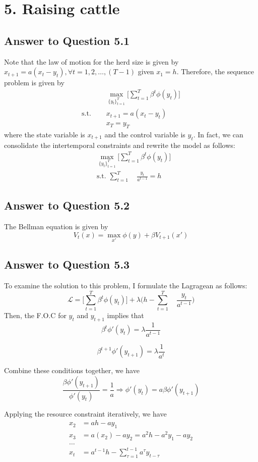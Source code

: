 \documentclass[11pt]{article}
\theoremstyle{definition}
\theoremstyle{boldtitle} %
\numberwithin{equation}{section}
\numberwithin{figure}{section}
\numberwithin{table}{section}
\begin{document}
\section*{5. Raising cattle}
\subsection*{Answer to Question 5.1}
Note that the law of motion for the herd size is given by $x_{t+1} = a (x_t - y_t), \forall t = 1,2, \ldots, (T-1)$ given $x_1 = h$.
Therefore, the sequence problem is given by 
\begin{align*}
& \max_{\{y_{t}\}_{t=1}^T} \bigg[\sum_{t=1}^T \beta^t \phi(y_t) \bigg] \\ 
\text{s.t.  } \quad & x_{t+1} = a(x_t - y_t) \\
& x_T = y_T
\end{align*}
where the state variable is $x_{t+1}$ and the control variable is $y_t$.
In fact, we can consolidate the intertemporal constraints and rewrite the model as follows:
\begin{align*}
& \max_{\{y_{t}\}_{t=1}^T} \bigg[\sum_{t=1}^T \beta^t \phi(y_t) \bigg] \\ 
& \text{s.t.  } \sum_{t=1}^T \quad \frac{y_t}{a^{t-1}} = h
\end{align*}


\subsection*{Answer to Question 5.2}
The Bellman equation is given by
\[
V_t(x) = \max_{x'} \phi(y) + \beta V_{t+1}(x')
\]


\subsection*{Answer to Question 5.3}
To examine the solution to this problem, I formulate the Lagragean as follows:
\[
\mathcal{L} = \bigg[\sum_{t=1}^T \beta^t \phi(y_t) \bigg] + \lambda \bigg(h - \sum_{t=1}^T \quad \frac{y_t}{a^{t-1}} \bigg)
\]
Then, the F.O.C for $y_t$ and $y_{t+1}$  implies that 
\[
\beta^t \phi'(y_t) = \lambda \frac{1}{a^{t-1}}
\]

\[
\beta^{t+1} \phi'(y_{t+1}) = \lambda \frac{1}{a^{t}}
\]

Combine these conditions together, we have 
\[
\frac{\beta \phi'(y_{t+1})}{\phi'(y_t)} = \frac{1}{a} \Rightarrow \phi'(y_t) = a \beta \phi'(y_{t+1})
\]

Applying the resource constraint iteratively, we have 
\begin{align*}
x_{2} & = ah - ay_1 \\
x_{3} & = a(x_2) - ay_2 = a^2 h - a^2 y_1 - a y_2 \\
\dots \\
x_t &= a^{t-1} h - \sum_{\tau = 1}^{t-1} {a^\tau y_{t-\tau}}
\end{align*}
\end{document}
